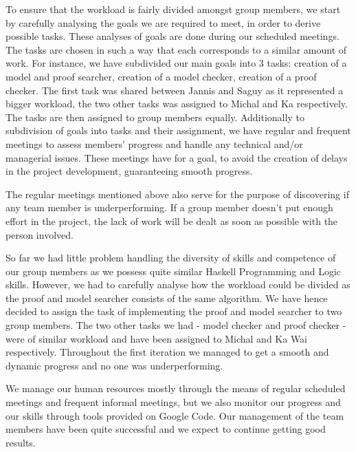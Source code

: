To ensure that the workload is fairly divided amongst group members, we start by carefully analysing the goals we are required to meet, in order to derive possible tasks. These analyses of goals are done during our scheduled meetings. The tasks are chosen in such a way that each corresponds to a similar amount of work. For instance, we have subdivided our main goals into 3 tasks: creation of a model and proof searcher, creation of a model checker, creation of a proof checker. The first task was shared between Jannis and Saguy as it represented a bigger workload, the two other tasks was assigned to Michal and Ka respectively. The tasks are then assigned to group members equally. Additionally to subdivision of goals into tasks and their assignment, we have regular and frequent meetings to assess members' progress and handle any technical and/or managerial issues. These meetings have for a goal, to avoid the creation of delays in the project development, guaranteeing smooth progress.

The regular meetings mentioned above also serve for the purpose of discovering if any team member is underperforming. If a group member doesn't put enough effort in the project, the lack of work will be dealt as soon as possible with the person involved.

So far we had little problem handling the diversity of skills and competence of our group members as we possess quite similar Haskell Programming and Logic skills. However, we had to carefully analyse how the workload could be divided as the proof and model searcher consists of the same algorithm. We have hence decided to assign the task of implementing the proof and model searcher to two group members. The two other tasks we had - model checker and proof checker - were of similar workload and have been assigned to Michal and Ka Wai respectively. Throughout the first iteration we managed to get a smooth and dynamic progress and no one was underperforming.

We manage our human resources mostly through the means of regular scheduled meetings and frequent informal meetings, but we also monitor our progress and our skills through tools provided on Google Code. Our management of the team members have been quite successful and we expect to continue getting good results. 
